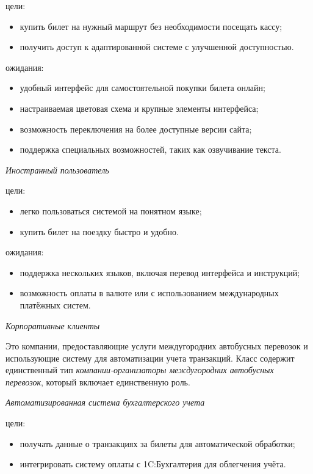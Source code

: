 \noindent цели:
\begin{itemize}
    \item купить билет на нужный маршрут без необходимости посещать
    кассу;
    \item получить доступ к адаптированной системе с улучшенной
    доступностью.
\end{itemize}

\noindent ожидания:
\begin{itemize}
    \item удобный интерфейс для самостоятельной покупки билета онлайн;
    \item настраиваемая цветовая схема и крупные элементы интерфейса;
    \item возможность переключения на более доступные версии сайта;
    \item поддержка специальных возможностей, таких как озвучивание
    текста.
\end{itemize}

\null

\noindent\textit{Иностранный пользователь}

\noindent цели:
\begin{itemize}
    \item легко пользоваться системой на понятном языке;
    \item купить билет на поездку быстро и удобно.
\end{itemize}

\noindent ожидания:
\begin{itemize}
    \item поддержка нескольких языков, включая перевод интерфейса и
    инструкций;
    \item возможность оплаты в валюте или с использованием международных
    платёжных систем.
\end{itemize}

\begin{center}
    \textit{Корпоративные клиенты}
\end{center}

Это компании, предоставляющие услуги междугородних автобусных перевозок и
использующие систему для автоматизации учета транзакций. Класс содержит
единственный тип \textit{компании-организаторы междугородних автобусных
перевозок}, который включает единственную роль.

\null

\noindent\textit{Автоматизированная система бухгалтерского учета}

\noindent цели:
\begin{itemize}
    \item получать данные о транзакциях за билеты для автоматической
    обработки;
    \item интегрировать систему оплаты с 1C:Бухгалтерия для облегчения
    учёта.
\end{itemize}

